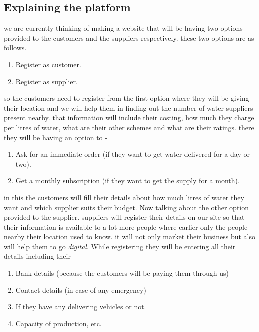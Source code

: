 \documentclass[a4paper, 12pt]{report}
\begin{document}
\subsection[short]{Explaining the platform}
we are currently thinking of making a website that will be having two options provided to the customers and the suppliers respectively.
these two options are as follows.
\begin{enumerate}
    \item Register as customer.
    \item Register as supplier.
\end{enumerate}
so the customers need to register from the first option where they will be giving their location and we will help them in finding
out the number of water suppliers present nearby. that information will include their costing, how much they charge per litres of water,
what are their other schemes and what are their ratings. there they will be having an option to -
\begin{enumerate}
    \item Ask for an immediate order (if they want to get water delivered for a day or two).
    \item Get a monthly subscription (if they want to get the supply for a month).
\end{enumerate}
in this the customers will fill their details about how much litres of water they want and which supplier suits their budget. Now talking about the other option provided
to the supplier. suppliers will register their details on our site so that their information is available to a lot more people where earlier only the people nearby their
location used to know. it will not only market their business but also will help them to go \textit{digital}. While registering they will be entering all their details
including their
\begin{enumerate}
    \item Bank details (because the customers will be paying them through us)
    \item Contact details (in case of any emergency)
    \item If they have any delivering vehicles or not.
    \item Capacity of production, etc.
\end{enumerate}
\end{document}
